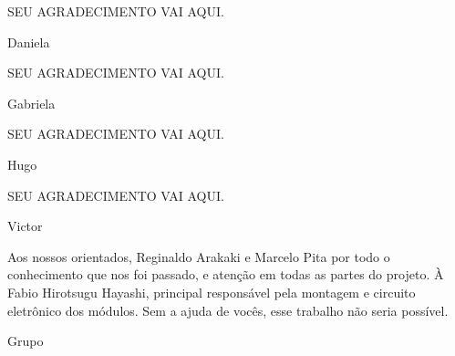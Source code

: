 SEU AGRADECIMENTO VAI AQUI.
\begin{flushright}
    Daniela
\end{flushright}

SEU AGRADECIMENTO VAI AQUI.
\begin{flushright}
    Gabriela
\end{flushright}

SEU AGRADECIMENTO VAI AQUI.
\begin{flushright}
    Hugo
\end{flushright}

SEU AGRADECIMENTO VAI AQUI.
\begin{flushright}
    Victor
\end{flushright}

Aos nossos orientados, Reginaldo Arakaki e Marcelo Pita por todo o conhecimento que nos foi passado, e atenção em todas as partes do projeto.
À Fabio Hirotsugu Hayashi, principal responsável pela montagem e circuito eletrônico dos módulos. Sem a ajuda de vocês, esse trabalho não seria possível.
\begin{flushright}
    Grupo
\end{flushright}
